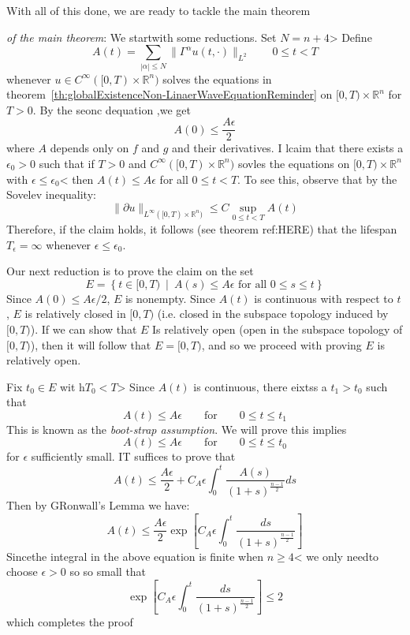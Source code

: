 \documentclass{book}
\newenvironment{Proof}[1][]
  {\begin{ProofTcb}[#1]}
  {\end{ProofTcb}}
\newcommand{\R}{{\mathbb{R}}}
\newcommand{\set}[2]{\left\{#1 \ \middle|\ #2\right\}}
\begin{document}
With all of this done, we are ready to tackle the main theorem

\begin{Proof}
	\emph{of the main theorem}: We startwith some reductions. Set $N = n+4$> Define
	\[
		A(t) = \sum_{|\alpha| \le N} \| \Gamma^\alpha u(t, \cdot)\|_{L^2} \qquad 0 \le t < T
	\]
	whenever $u \in C^\infty([0, T)\times \R^n)$ solves the equations in
	theorem~\ref{th:globalExistenceNon-LinaerWaveEquationReminder} on $[0, T)\times \R^n$
	for $T > 0$. By the seonc dequation ,we get
	\begin{equation}\label{eq:ValueOnA}
	  A(0) \le \frac{A\epsilon}{2}
	\end{equation}
	where $A$ depends only on $f$ and $g$ and their derivatives. I lcaim that there exists a $\epsilon_0 > 0$ such
	that if $T > 0$ and $C^\infty([0, T)\times \R^n)$ sovles the equations on $[0, T) \times \R^n$ with $\epsilon
	\le \epsilon_0$< then $A(t) \le A\epsilon$ for all $ 0\le t < T$. To see this, observe that by the Sovelev
	inequality:
	\[
		\|  \partial u\|_{L^\infty([0,T)\times \R^n)} \le C\sup_{0 \le t < T} A(t)
	\]
	Therefore, if the claim holds, it follows (see theorem ref:HERE)  that the lifespan $T_\epsilon = \infty$ whenever $\epsilon \le
	\epsilon_0$.

	Our next reduction is to prove the claim on the set
	\[
		E = \set{t \in [0, T)}{A(s) \le A\epsilon\text{ for all $0 \le s \le t$}}
	\]
	Since $A(0) \le A\epsilon/2$, $E$ is nonempty. Since $A(t)$ is continuous with respect to $t$, $E$ is
	relatively closed in $[0, T)$ (i.e. closed in the subspace topology induced by $[0, T)$). If we can show that
	$E$ Is relatively open (open in the subspace topology of $[0, T)$), then it will follow that $E = [0, T)$,
	and so we proceed with proving $E$ is relatively open.

	Fix $t_0 \in E$ wit h$T_0 < T$> Since $A(t)$ is continuous, there eixtss a $t_1 > t_0$ such that
	\[
		A(t) \le A\epsilon \qquad \text{for} \qquad  0 \le t \le t_1
	\]
	This is known as the \emph{boot-strap assumption}. We will prove this implies
	\[
		A(t) \le A\epsilon \qquad \text{for} \qquad 0 \le t \le t_0
	\]
	for $\epsilon$ sufficiently small. IT suffices to prove that
	\[
		A(t) \le \frac{A\epsilon}{2} + C_A\epsilon \int_0^t \frac{A(s)}{(1+s)^{\frac{n-1}{2}}}ds
	\]
	Then by GRonwall's Lemma we have:
	\[
		A(t) \le \frac{A\epsilon}{2} \exp\left[ C_A \epsilon \int_0^t \frac{ds}{(1+s)^{\frac{n-1}{2}}}\right]
	\]
	Sincethe integral in the above equation is finite when $n \ge 4$< we only needto choose $\epsilon > 0$ so so
	small that
	\[\exp\left[ C_A \epsilon \int_0^t \frac{ds}{(1+s)^{\frac{n-1}{2}}}\right] \le 2
	\]
	which completes the proof


\end{Proof}
\end{document}
